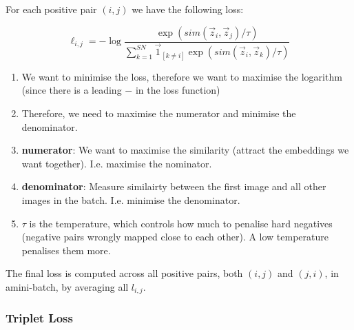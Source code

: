 \documentclass[11pt]{article}
\begin{document}
For each positive pair $(i,j)$ we have the following loss:

\begin{equation}
    \ell_{i,j} = - \log \frac{\exp(sim(\vec z_i, \vec z_j)/\tau)}{\sum^{SN}_{k=1} \vec 1_{[k\neq i]} \exp(sim(\vec z_i, \vec z_k)/\tau)} 
\end{equation}

\begin{enumerate}
    \item We want to minimise the loss, therefore we want to maximise the logarithm (since there is a leading $-$ in the loss function)
    \item Therefore, we need to maximise the numerator and minimise the denominator.
    \item \textbf{numerator}: We want to maximise the similarity (attract the embeddings we want together). I.e. maximise the nominator.
    \item \textbf{denominator}: Measure similairty between the first image and all other images in the batch. I.e. minimise the denominator.
    \item $\tau$ is the temperature, which controls how much to penalise hard negatives (negative pairs wrongly mapped close to each other). A low temperature penalises them more.
\end{enumerate}

The final loss is computed across all positive pairs, both $(i,j)$ and $(j,i)$, in amini-batch, by averaging all $l_{i,j}$.

\begin{figure}[H]
    \centering
\end{figure}

\subsubsection{Triplet Loss}
\end{document}
